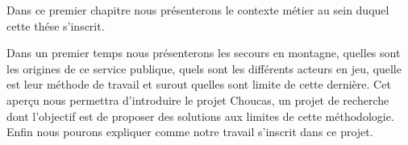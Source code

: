 Dans ce premier chapitre nous présenterons le contexte métier au sein
duquel cette thése s'inscrit.

Dans un premier temps nous présenterons les secours en montagne,
quelles sont les origines de ce service publique, quels sont les
différents acteurs en jeu, quelle est leur méthode de travail et
surout quelles sont limite de cette dernière. Cet aperçu nous
permettra d'introduire le projet Choucas, un projet de recherche dont
l'objectif est de proposer des solutions aux limites de cette
méthodologie. Enfin nous pourons expliquer comme notre travail
s'inscrit dans ce projet.